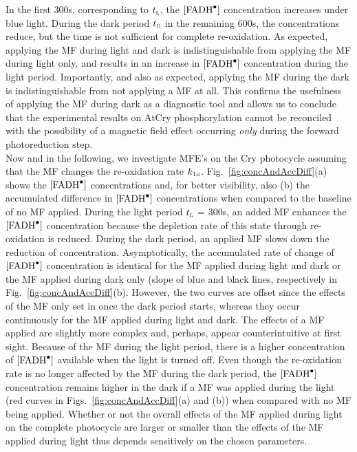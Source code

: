 \documentclass[twoside,twocolumn,9pt]{article}
\begin{document}
In the first 300s, corresponding to $t_{\textsc{l}}$, the $[\ce{FADH^{.}}]$ concentration increases under blue light. During the
dark period $t_{\textsc{d}}$ in the remaining 600s, the concentrations reduce, but the time is not sufficient for complete
re-oxidation. As expected, applying the MF during light and dark is indistinguishable from applying the MF during light only, and
results in an increase in $[\ce{FADH^{.}}]$ concentration during the light period. Importantly, and also as expected, applying the
MF during the dark is indistinguishable from not applying a MF at all. This confirms the usefulness of applying the MF during dark
as a diagnostic tool and allows us to conclude that the experimental results on AtCry phosphorylation \cite{Pooam2019} cannot be
reconciled with the possibility of a magnetic field effect occurring \emph{only} during the forward photoreduction step.\\

Now and in the following, we investigate MFE's on the Cry photocycle assuming that the MF changes the re-oxidation rate
$k_{1\textsc{b}}$. Fig.~\ref{fig:concAndAccDiff}(a) shows the $[\ce{FADH^{.}}]$ concentrations and, for better visibility, also (b)
the accumulated difference in $[\ce{FADH^{.}}]$ concentrations when compared to the baseline of no MF applied. During the light
period $t_{\textsc{l}}$ = 300s, an added MF enhances the $[\ce{FADH^{.}}]$ concentration because the depletion rate of this state
through re-oxidation is reduced. During the dark period, an applied MF slows down the reduction of concentration. Asymptotically,
the accumulated rate of change of $[\ce{FADH^{.}}]$ concentration is identical for the MF applied during light and dark or the MF
applied during dark only (slope of blue and black lines, respectively in Fig.~\ref{fig:concAndAccDiff}(b). However, the two curves
are offset since the effects of the MF only set in once the dark period starts, whereas they occur continuously for the MF applied
during light and dark. The effects of a MF applied are slightly more complex and, perhaps, appear counterintuitive at first sight.
Because of the MF during the light period, there is a higher concentration of $[\ce{FADH^{.}}]$ available when the light is turned
off. Even though the re-oxidation rate is no longer affected by the MF during the dark period, the $[\ce{FADH^{.}}]$ concentration
remains higher in the dark if a MF was applied during the light (red curves in Figs.~\ref{fig:concAndAccDiff}(a) and (b)) when
compared with no MF being applied. Whether or not the overall effects of the MF applied during light on the complete photocycle are
larger or smaller than the effects of the MF applied during light thus depends sensitively on the chosen parameters.
\end{document}
